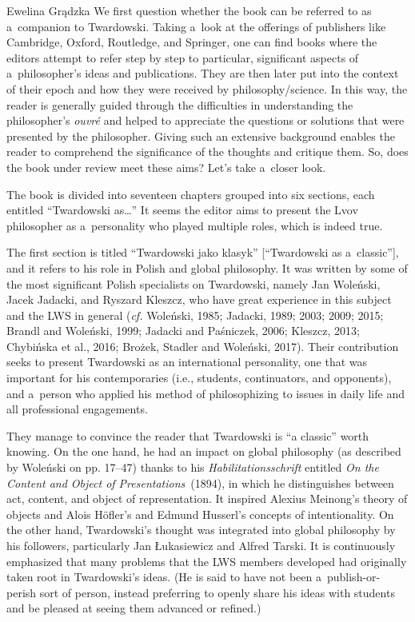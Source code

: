 \begin{newrevengenv}{Ewelina Grądzka}
We first question whether the book can be referred to as a~companion to Twardowski. Taking a~look at the offerings of publishers like Cambridge, Oxford, Routledge, and Springer, one can find books where the editors attempt to refer step by step to particular, significant aspects of a~philosopher's ideas and publications. They are then later put into the context of their epoch and how they were received by philosophy/science. In this way, the reader is generally guided through the difficulties in understanding the philosopher's \textit{ouvré} and helped to appreciate the questions or solutions that were presented by the philosopher. Giving such an extensive background enables the reader to comprehend the significance of the thoughts and critique them. So, does the book under review meet these aims? Let's take a~closer look.

The book is divided into seventeen chapters grouped into six sections, each entitled ``Twardowski as…'' It seems the editor aims to present the Lvov philosopher as a~personality who played multiple roles, which is indeed true.

The first section is titled ``Twardowski jako klasyk'' [``Twardowski as a~classic''], and it refers to his role in Polish and global philosophy. It was written by some of the most significant Polish specialists on Twardowski, namely Jan Woleński, Jacek Jadacki, and Ryszard Kleszcz, who have great experience in this subject and the LWS in general (\textit{cf.} Woleński, 1985; Jadacki, 1989; 2003; 2009; 2015; Brandl and Woleński, 1999; Jadacki and Paśniczek, 2006; Kleszcz, 2013; Chybińska et al., 2016; Brożek, Stadler and Woleński, 2017). Their contribution seeks to present Twardowski as an international personality, one that was important for his contemporaries (i.e., students, continuators, and opponents), and a~person who applied his method of philosophizing to issues in daily life and all professional engagements.

They manage to convince the reader that Twardowski is ``a classic'' worth knowing. On the one hand, he had an impact on global philosophy (as described by Woleński on pp. 17–47) thanks to his \textit{Habilitationsschrift} entitled \textit{On the Content and Object of Presentations}~(1894), in which he distinguishes between act, content, and object of representation. It inspired Alexius Meinong's theory of objects and Alois Höfler's and Edmund Husserl's concepts of intentionality. On the other hand, Twardowski's thought was integrated into global philosophy by his followers, particularly Jan Łukasiewicz and Alfred Tarski. It is continuously emphasized that many problems that the LWS members developed had originally taken root in Twardowski's ideas. (He is said to have not been a~publish-or-perish sort of person, instead preferring to openly share his ideas with students and be pleased at seeing them advanced or refined.)


\end{newrevengenv}
